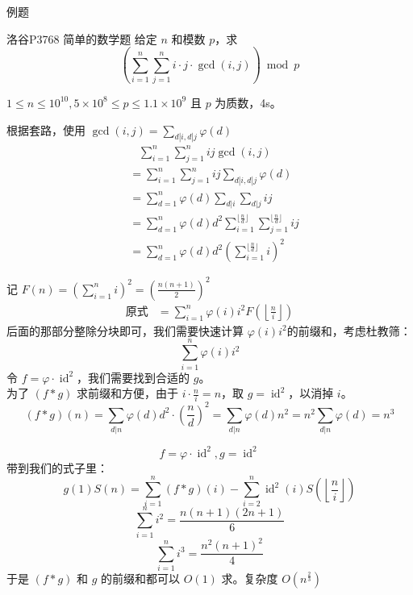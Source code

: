\documentclass[UTF8]{beamer}
\begin{document}
\begin{frame}{例题}
    \begin{block}{洛谷P3768 简单的数学题}
        给定 $n$ 和模数 $p$，求
$$
\left(\sum_{i=1}^n\sum_{j=1}^n i\cdot j\cdot \gcd(i,j)\right) \bmod p
$$

$1\le n\le 10^{10},5 \times 10^8 \leq p \leq 1.1 \times 10^9$ 且 $p$ 为质数，4s。
    \end{block}
\end{frame}
\begin{frame}
    根据套路，使用 $\gcd(i,j)=\sum_{d|i,d|j}\varphi(d)$
    $$
    \begin{aligned}
        &\ \ \ \,\sum_{i=1}^n\sum_{j=1}^n ij \gcd(i,j)\\
        &=\sum_{i=1}^n\sum_{j=1}^nij\sum_{d|i,d|j}\varphi(d)\\
        &=\sum_{d=1}^n\varphi(d)\sum_{d|i}\sum_{d|j}ij\\
        &=\sum_{d=1}^n\varphi(d)d^2\sum_{i=1}^{\lfloor\frac{n}{d}\rfloor}\sum_{j=1}^{\lfloor\frac{n}{d}\rfloor}ij\\
        &=\sum_{d=1}^n\varphi(d)d^2\left(\sum_{i=1}^{\lfloor\frac{n}{d}\rfloor}i\right)^2
    \end{aligned}
    $$
    
\end{frame}
\begin{frame}
    记 $F(n)=(\sum_{i=1}^ni)^2=\left(\frac{n(n+1)}{2}\right)^2$\\
    $$
    \begin{aligned}
        \text{原式}&=\sum_{i=1}^n\varphi(i)i^2F\left(\left\lfloor\frac{n}{i}\right\rfloor\right)    
    \end{aligned}
    $$
    后面的那部分整除分块即可，我们需要快速计算 $\varphi(i)i^2$的前缀和，考虑杜教筛：\\
    $$
    \sum_{i=1}^n\varphi(i)i^2
    $$
    令 $f=\varphi\cdot \operatorname{id}^2$，我们需要找到合适的 $g$。\\
    \pause
    为了 $(f\ast g)$ 求前缀和方便，由于 $i\cdot\frac{n}{i}=n$，取 $g=\operatorname{id}^2$，以消掉 $i$。\\
    $$
    (f\ast g)(n)=\sum_{d|n}\varphi(d)d^2\cdot \left(\frac{n}{d}\right)^2=\sum_{d|n}\varphi(d)n^2=n^2\sum_{d|n}\varphi(d)=n^3
    $$
\end{frame}
\begin{frame}
    $$
    f=\varphi\cdot \operatorname{id}^2,g=\operatorname{id}^2
    $$
    带到我们的式子里：
    $$
    g(1)S(n)=\sum_{i=1}^n(f\ast g)(i)-\sum_{i=2}^n\operatorname{id}^2(i)S\left(\left\lfloor\frac{n}{i}\right\rfloor\right)
    $$
    \pause
    $$
    \sum_{i=1}^ni^2=\frac{n(n+1)(2n+1)}{6}
    $$
    $$
    \sum_{i=1}^ni^3=\frac{n^2(n+1)^2}{4}
    $$
    于是 $(f\ast g)$ 和 $g$ 的前缀和都可以 $O(1)$ 求。复杂度 $O(n^{\frac{2}{3}})$
\end{frame}
\end{document}
